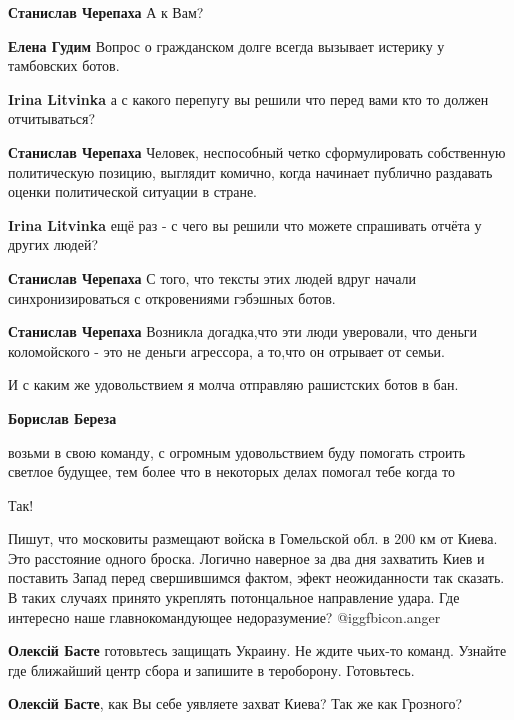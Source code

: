 \begin{itemize}
\begin{itemize}
\textbf{Станислав Черепаха} А к Вам?

\textbf{Елена Гудим} Вопрос о гражданском долге всегда вызывает истерику у тамбовских ботов.

\textbf{Irina Litvinka} а с какого перепугу вы решили что перед вами кто то должен отчитываться?

\textbf{Станислав Черепаха} Человек, неспособный четко сформулировать собственную политическую позицию, выглядит комично, когда начинает публично раздавать оценки политической ситуации в стране.

\textbf{Irina Litvinka} ещё раз - с чего вы решили что можете спрашивать отчёта у других людей?

\textbf{Станислав Черепаха} С того, что тексты этих людей вдруг начали синхронизироваться с откровениями гэбэшных ботов.

\textbf{Станислав Черепаха} Возникла догадка,что эти люди уверовали, что деньги коломойского - это не деньги агрессора, а то,что он отрывает от семьи.
\end{itemize} %

И с каким же удовольствием я молча отправляю рашистских ботов в бан.

\textbf{Борислав Береза} 

возьми в свою команду, с огромным удовольствием буду помогать строить светлое
будущее, тем более что в некоторых делах помогал тебе когда то

Так!


Пишут, что московиты размещают войска в Гомельской обл. в 200 км от Киева. Это
расстояние одного броска. Логично наверное за два дня захватить Киев и
поставить Запад перед свершившимся фактом, эфект неожиданности так сказать. В
таких случаях принято укреплять потонцальное направление удара. Где интересно
наше главнокомандующее недоразумение?  @igg{fbicon.anger} 

\begin{itemize} %
\textbf{Олексій Басте} готовьтесь защищать Украину. Не ждите чьих-то команд. Узнайте где ближайший центр сбора и запишите в тероборону. Готовьтесь.

\textbf{Олексій Басте}, как Вы себе уявляете захват Киева? Так же как Грозного?


\end{itemize}
\end{itemize}

